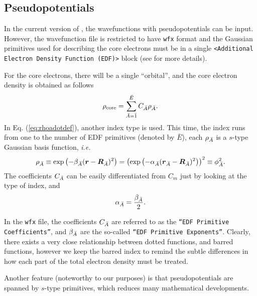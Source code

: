 \subsection*{Pseudopotentials}

In the current version of \DTK{}, the wavefunctions with pseudopotentials can be
input. However, the wavefunction file is restricted to have \texttt{wfx} format
and the Gaussian primitives used for describing the core electrons must be in a
single \texttt{<Additional Electron Density Function (EDF)>} block (see
\cite{bib:webwfxformat} for more details).

For the core electrons, there will be a single ``orbital'', and the core electron
density  is obtained as follows
%
\begin{equation}\label{eq:rhoadotdef}
  \rho_{\textrm{core}}=\sum_{\bar{A}=\bar 1}^{\bar E}C_{\bar{A}}\rho_{\bar{A}}.
\end{equation}
%
In Eq. (\ref{eq:rhoadotdef}), another index type is used. This time, the index runs
from one to the number of EDF primitives (denoted by $\bar E$), 
each $\rho_{\bar{A}}$ is a $s$-type Gaussian basis
function, \textit{i.e.}
%
\begin{equation}%
  \rho_{\bA}\equiv\exp\left( -\beta_{\bA}(\boldsymbol r-\boldsymbol R_{\bA})^2 \right)
  =\left( \exp\left( -\alpha_{\bA}(\boldsymbol r_{\bA}-\boldsymbol R_{\bA})^2 \right) \right)^2
  \equiv\phi_{\bA}^2.
\end{equation}
%
The coefficients $C_{\bar{A}}$ can be easily differentiated from $C_m$ just by
looking at the type of index, and 
%
\begin{equation}%
  \alpha_{\bA}=\frac{\beta_{\bA}}{2}.
\end{equation}
%


In the \texttt{wfx} file, the coefficients $C_{\bar{A}}$ are referred to as the
\texttt{``EDF Primitive Coefficients''}, and $\beta_{\bar{A}}$ are the so-called
\texttt{``EDF Primitive Exponents''}.
Clearly, there exists a very close relationship between dotted functions, and barred
functions, however we keep the barred index to remind the subtle differences 
in how each part of the total electron density must be treated.

Another feature (noteworthy to our purposes) is that pseudopotentials are 
spanned by $s$-type primitives, which reduces many mathematical developments.



